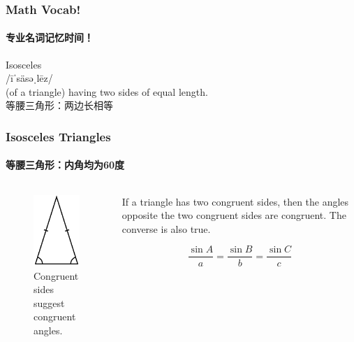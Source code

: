 \documentclass[
	11pt, %
]{beamer}
\begin{document}
\begin{frame}
	\frametitle{Math Vocab!} %
	\framesubtitle{专业名词记忆时间！}
	
	{\Huge Isosceles}\\
	{\LARGE /īˈsäsəˌlēz/\\
		\bigskip\bigskip
	(of a triangle) having two sides of equal length. \\ 
	等腰三角形：两边长相等}

\end{frame}


\begin{frame}
	\frametitle{Isosceles Triangles} %
	\framesubtitle{等腰三角形：内角均为60度}



	\begin{columns}[t] 

		\begin{column}{0.5\textwidth} %
			\begin{figure}
				\includegraphics[width=0.5\linewidth]{220px-Triangle.Isosceles.svg.png}
				\caption{Congruent sides suggest congruent angles.}
			\end{figure}		
		\end{column}
		\begin{column}{0.5\textwidth} %
		\begin{theorem}[两角相等互推两边相等]
			If a triangle has two congruent sides, then the angles opposite
the two congruent sides are congruent. \alert{The converse is also true}.
		\end{theorem}
		\pause
		\begin{theorem}
			\begin{equation*}
				\frac{\sin A}{a}=\frac{\sin B}{b}=\frac{\sin C}{c}
			\end{equation*}
		\end{theorem}
		\end{column}
	\end{columns}
\end{frame}
\end{document}
